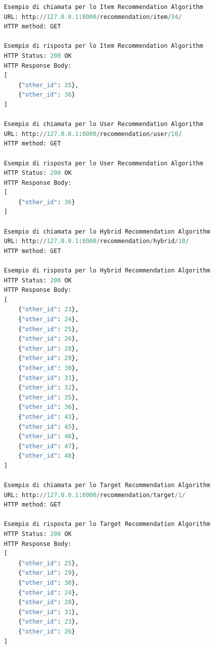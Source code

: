 \begin{lstlisting}[language=Python, label=lst:view_rec_ex, caption={Esempi di chiamate e risposte HTTP per i diversi algoritmi di raccomandazione.}]
Esempio di chiamata per lo Item Recommendation Algorithm
URL: http://127.0.0.1:8000/recommendation/item/34/ 
HTTP method: GET
 
Esempio di risposta per lo Item Recommendation Algorithm
HTTP Status: 200 OK
HTTP Response Body:
[
    {"other_id": 35},
    {"other_id": 36}
]
 
Esempio di chiamata per lo User Recommendation Algorithm
URL: http://127.0.0.1:8000/recommendation/user/10/ 
HTTP method: GET
 
Esempio di risposta per lo User Recommendation Algorithm
HTTP Status: 200 OK
HTTP Response Body:
[
    {"other_id": 36}
]
 
Esempio di chiamata per lo Hybrid Recommendation Algorithm
URL: http://127.0.0.1:8000/recommendation/hybrid/10/ 
HTTP method: GET
 
Esempio di risposta per lo Hybrid Recommendation Algorithm
HTTP Status: 200 OK
HTTP Response Body:
[
    {"other_id": 23},
    {"other_id": 24},
    {"other_id": 25},
    {"other_id": 26},
    {"other_id": 28},
    {"other_id": 29},
    {"other_id": 30},
    {"other_id": 31},
    {"other_id": 32},
    {"other_id": 35},
    {"other_id": 36},
    {"other_id": 43},
    {"other_id": 45},
    {"other_id": 46},
    {"other_id": 47},
    {"other_id": 48}
]
 
Esempio di chiamata per lo Target Recommendation Algorithm
URL: http://127.0.0.1:8000/recommendation/target/1/ 
HTTP method: GET
 
Esempio di risposta per lo Target Recommendation Algorithm
HTTP Status: 200 OK
HTTP Response Body:
[
    {"other_id": 25},
    {"other_id": 29},
    {"other_id": 30},
    {"other_id": 24},
    {"other_id": 28},
    {"other_id": 31},
    {"other_id": 23},
    {"other_id": 26}
]
\end{lstlisting}
%
\newpage
%
